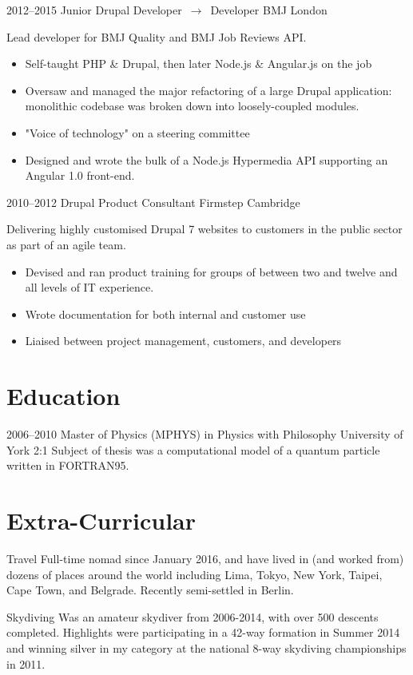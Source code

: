 \documentclass[10pt,a4paper,sans]{moderncv}
\begin{document}
\cventry
  {2012--2015}
  {Junior Drupal Developer $\,\to\,$ Developer}
  {BMJ}
  {London}
  {}
  {
    Lead developer for BMJ Quality and BMJ Job Reviews API.
    \begin{itemize}
      \item Self-taught PHP \& Drupal, then later Node.js \& Angular.js on the job
      \item Oversaw and managed the major refactoring of a large Drupal application: monolithic codebase was broken down into loosely-coupled modules.
      \item "Voice of technology" on a steering committee
      \item Designed and wrote the bulk of a Node.js Hypermedia API supporting an Angular 1.0 front-end.
    \end{itemize}
  }

\cventry
  {2010--2012}
  {Drupal Product Consultant}
  {Firmstep}
  {Cambridge}
  {}
  {
    Delivering highly customised Drupal 7 websites to customers in the public sector as part of an agile team.
    \begin{itemize}
      \item Devised and ran product training for groups of between two and twelve and all levels of IT experience.
      \item Wrote documentation for both internal and customer use
      \item Liaised between project management, customers, and developers
    \end{itemize}
  }

\section{Education}

\cventry
  {2006--2010}
  {Master of Physics (\small{MPHYS}) in Physics with Philosophy}
  {University of York}
  {}
  {2:1}
  {
    Subject of thesis was a computational model of a quantum particle written in FORTRAN95.
  }

\section{Extra-Curricular}

\cvitem
  {Travel}
  {
    Full-time nomad since January 2016, and have lived in (and worked from) dozens of places around the world including Lima, Tokyo, New York, Taipei, Cape Town, and Belgrade. Recently semi-settled in Berlin.
  }

\cvitem
  {Skydiving}
  {
    Was an amateur skydiver from 2006-2014, with over 500 descents completed. Highlights were participating in a 42-way formation in Summer 2014 and winning silver in my category at the national 8-way skydiving championships in 2011.
  }
\end{document}
